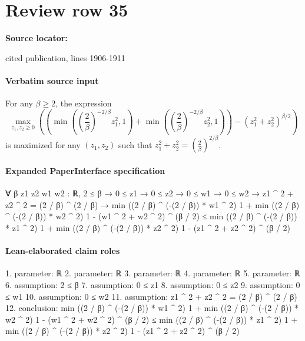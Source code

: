 \documentclass[10pt]{article}
\begin{document}
\section*{Review row 35}
\textbf{Source locator:} {\footnotesize\raggedright cited publication, lines 1906-\allowbreak{}1911\par}
\paragraph{Verbatim source input}
\begin{ReviewVerbatim}
\begin{lemma}
\label{lemma:standardbasismax}
For any $\beta \ge 2$, the expression
\[\max_{z_1, z_2 \ge 0} \left(\left(\min\left(\left(\frac{2}{\beta} \right)^{-2/\beta} z_1^2, 1\right) + \min\left(\left(\frac{2}{\beta} \right)^{-2/\beta} z_2^2, 1\right)\right) - (z_1^2 + z_2^2)^{\beta / 2}\right)\]
is maximized for any $(z_1, z_2)$ such that $z_1^2 + z_2^2 = \left(\frac{2}{\beta}\right)^{2/\beta}$.
\end{lemma}
\end{ReviewVerbatim}



\paragraph{Expanded PaperInterface specification}
\begin{ReviewVerbatim}
∀ {β z1 z2 w1 w2 : ℝ},
  2 ≤ β →
    0 ≤ z1 →
      0 ≤ z2 →
        0 ≤ w1 →
          0 ≤ w2 →
            z1 ^ 2 + z2 ^ 2 = (2 / β) ^ (2 / β) →
              min ((2 / β) ^ (-(2 / β)) * w1 ^ 2) 1 + min ((2 / β) ^ (-(2 / β)) * w2 ^ 2) 1 -
                  (w1 ^ 2 + w2 ^ 2) ^ (β / 2) ≤
                min ((2 / β) ^ (-(2 / β)) * z1 ^ 2) 1 + min ((2 / β) ^ (-(2 / β)) * z2 ^ 2) 1 -
                  (z1 ^ 2 + z2 ^ 2) ^ (β / 2)
\end{ReviewVerbatim}


\paragraph{Lean-elaborated claim roles}\begin{ReviewVerbatim}
1. parameter: ℝ
2. parameter: ℝ
3. parameter: ℝ
4. parameter: ℝ
5. parameter: ℝ
6. assumption: 2 ≤ β
7. assumption: 0 ≤ z1
8. assumption: 0 ≤ z2
9. assumption: 0 ≤ w1
10. assumption: 0 ≤ w2
11. assumption: z1 ^ 2 + z2 ^ 2 = (2 / β) ^ (2 / β)
12. conclusion: min ((2 / β) ^ (-(2 / β)) * w1 ^ 2) 1 + min ((2 / β) ^ (-(2 / β)) * w2 ^ 2) 1 - (w1 ^ 2 + w2 ^ 2) ^ (β / 2) ≤
  min ((2 / β) ^ (-(2 / β)) * z1 ^ 2) 1 + min ((2 / β) ^ (-(2 / β)) * z2 ^ 2) 1 - (z1 ^ 2 + z2 ^ 2) ^ (β / 2)
\end{ReviewVerbatim}
\end{document}
